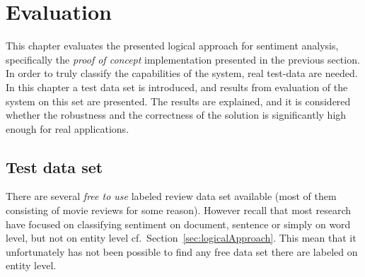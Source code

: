 
\chapter{Evaluation}
\label{chap:evaluation}

This chapter evaluates the presented logical approach for sentiment analysis, specifically the \emph{proof of concept} implementation presented in the previous section. In order to truly classify the capabilities of the system, real test-data are needed. In this chapter a test data set is introduced, and results from evaluation of the system on this set are presented. The results are explained, and it is considered whether the robustness and the correctness of the solution is significantly high enough for real applications.

\section{Test data set}
There are several \emph{free to use} labeled review data set available (most of them consisting of movie reviews for some reason). However recall that most research have focused on classifying sentiment on document, sentence or simply on word level, but not on entity level cf.\ Section~\vref{sec:logicalApproach}. This mean that it unfortunately has not been possible to find any free data set there are labeled on entity level. %

